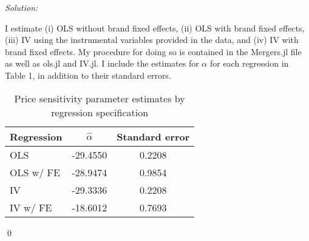 \documentclass[12pt]{article}
\newenvironment{problem}[2][Problem]{\begin{trivlist}
\item[\hskip \labelsep {\bfseries #1}\hskip \labelsep {\bfseries #2.}]}{\end{trivlist}}
\newenvironment{sol}
    {\emph{Solution:}
    }
    {
    \qed
    }
\begin{document}
\begin{problem}{1}
\end{problem}
\begin{sol}
    I estimate (i) OLS without brand fixed effects, (ii) OLS with brand fixed effects, (iii) IV using the instrumental variables provided in the data, and (iv) IV with brand fixed effects. My procedure for doing so is contained in the Mergers.jl file as well as ols.jl and IV.jl. I include the estimates for $\alpha$ for each regression in Table 1, in addition to their standard errors.
    \begin{center}
        \begin{table}[htbp]
            \centering
            \caption{Price sensitivity parameter estimates by regression specification}
              \begin{tabular}{lcc}
                  \toprule
                    Regression                & $\hat{\alpha}$             & Standard error            \\
                  \midrule
                    OLS    &  -29.4550  & 0.2208\\
                    OLS w/ FE  & -28.9474& 0.9854   \\
                    IV  &   -29.3336  & 0.2208  \\
                    IV w/ FE  & -18.6012 & 0.7693    \\
                  \bottomrule
              \end{tabular}
            \label{tab:reg_est}
          \end{table}
    \end{center}
\end{sol}
\begin{problem}{2}
\end{problem}
\end{document}
